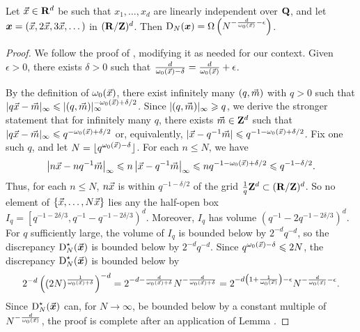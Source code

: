 \begin{theorem}\label{thm:disc-lower-bound}
Let $\vec{x}\in \mathbf{R}^d$ be such that $x_1,\dots,x_d$ are linearly independent over 
$\mathbf{Q}$, and let ${\boldsymbol x}=(\vec{x},2\vec{x},3\vec{x},\dots)$ in $(\mathbf{R}/\mathbf{Z})^d$. Then 
$\operatorname{D}_N({\boldsymbol x}) = \Omega\left(N^{-\frac{d}{\omega_0(\vec{x})}-\epsilon} \right)$. 
\end{theorem}
\begin{proof}
We follow the proof of \cite[Ch.~2, Th.~3.3]{kuipers-niederreiter-1974}, 
modifying it as needed for our context. Given $\epsilon>0$, there exists 
$\delta>0$ such that 
$\frac{d}{\omega_0(\vec{x})-\delta} = \frac{d}{\omega_0(\vec{x})} + \epsilon$. 

By the definition of $\omega_0(\vec{x})$, there exist infinitely many 
$(q,\vec{m})$ with $q>0$ such that 
$|q \vec{x} - \vec{m}|_\infty \leqslant |(q,\vec{m})|_\infty^{-\omega_0(\vec{x})+\delta/2}$. 
Since $|(q,\vec{m})|_\infty \geqslant q$, we derive the stronger 
statement that for infinitely many $q$, there exists 
$\vec{m}\in \mathbf{Z}^d$ such that 
$|q \vec{x}-\vec{m}|_\infty \leqslant q^{-\omega_0(\vec{x})+\delta/2}$ or, equivalently, 
$|\vec{x}-q^{-1}\vec{m}| \leqslant q^{-1-\omega_0(\vec{x})+\delta/2}$. Fix one such $q$, 
and let $N=\lfloor q^{\omega_0(\vec{x})-\delta}\rfloor$. For each $n\leqslant N$, 
we have 
\[
	\left|n \vec{x} - n q^{-1} \vec{m}\right|_\infty 
		\leqslant n \left|\vec{x} - q^{-1} \vec{m}\right|_\infty
		\leqslant n q^{-1-\omega_0(\vec{x})+\delta/2}
		\leqslant q^{-1-\delta/2}. 
\]
Thus, for each $n\leqslant N$, $n \vec{x}$ is within $q^{-1-\delta/2}$ of the 
grid $\frac 1 q \mathbf{Z}^d\subset (\mathbf{R}/\mathbf{Z})^d$. So no element of 
$\{\vec{x},\dots,N \vec{x}\}$ lies any the half-open box 
$I_q = \left[ q^{-1 - 2\delta / 3}, q^{-1} - q^{-1 - 2\delta / 3}\right)^d$. 
Moreover, $I_q$ has volume $\left(q^{-1} - 2q^{-1 - 2\delta / 3}\right)^d$. 
For $q$ sufficiently large, the volume of $I_q$ is bounded below by 
$2^{-d} q^{-d}$, so the discrepancy $\operatorname{D}_N^\star(\vec{\boldsymbol x})$ is 
bounded below by $2^{-d} q^{-d}$. Since $q^{\omega_0(\vec{x})-\delta} \leqslant 2 N$, 
the discrepancy $\operatorname{D}_N^\star(\vec{\boldsymbol x})$ is bounded below by 
\[
	2^{-d} \left( (2 N)^{\frac{1}{\omega_0(\vec{x})+\delta}}\right)^{-d} 
		= 2^{-d-\frac{d}{\omega_0(\vec{x})+\delta}} N^{-\frac{d}{\omega_0(\vec{x})+\delta}}
		= 2^{-d\left(1+\frac{1}{\omega_0(\vec{x})}\right)-\epsilon} N^{-\frac{d}{\omega_0(\vec{x})}-\epsilon} .
\]
Since $\operatorname{D}_N^\star(\vec{\boldsymbol x})$ can, for $N\to \infty$, be bounded below by a constant 
multiple of $N^{-\frac{d}{\omega_0(\vec{x})}}$, the proof is complete after an 
application of Lemma \cite{lem:star-reg-disc}. 
\end{proof}






